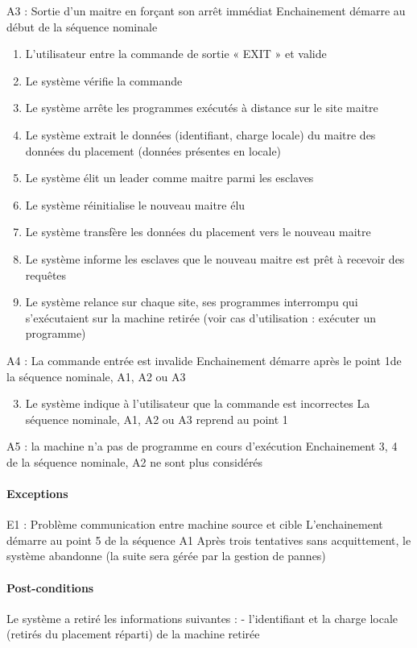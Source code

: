     A3 : Sortie d'un maitre en forçant son arrêt immédiat
         Enchainement démarre au début de la séquence nominale
        \begin{enumerate}
          \item L'utilisateur entre la commande de sortie « EXIT » et valide
          \item Le système vérifie la commande
          \item Le système arrête les programmes exécutés à distance sur le site maitre
          \item Le système extrait le données (identifiant, charge locale) du maitre des données du
              placement (données présentes en locale)
          \item Le système élit un leader comme maitre parmi les esclaves
          \item Le système réinitialise le nouveau maitre élu
          \item Le système transfère les données du placement vers le nouveau maitre
          \item Le système informe les esclaves que le nouveau maitre est prêt à recevoir des requêtes
          \item Le système relance sur chaque site, ses programmes interrompu qui s'exécutaient sur la
              machine retirée (voir cas d'utilisation : exécuter un programme)
        \end{enumerate}
    A4 : La commande entrée est invalide
         Enchainement démarre après le point 1de la séquence nominale, A1, A2 ou A3
        \begin{enumerate}
        \setcounter{enumi}{2}
          \item Le système indique à l'utilisateur que la commande est incorrectes
         La séquence nominale, A1, A2 ou A3 reprend au point 1
        \end{enumerate}
    A5 : la machine n'a pas de programme en cours d'exécution
         Enchainement 3, 4 de la séquence nominale, A2 ne sont plus considérés
    \paragraph{Exceptions}
    E1 : Problème communication entre machine source et cible
         L'enchainement démarre au point 5 de la séquence A1
            Après trois tentatives sans acquittement, le système abandonne (la suite sera gérée par la
            gestion de pannes)
    \paragraph{Post-conditions}
            Le système a retiré les informations suivantes :
                   - l'identifiant et la charge locale (retirés du placement réparti) de la machine retirée

